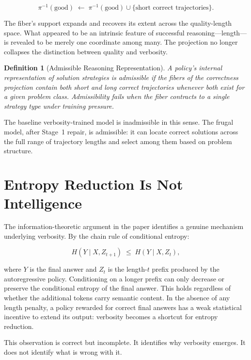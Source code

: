 \documentclass[11pt]{article}
\theoremstyle{rthm}
\theoremstyle{rdef}
\newtheorem{definition}[theorem]{Definition}
\theoremstyle{remark}
\begin{document}
\[
\pi^{-1}(\text{good}) \;\longleftarrow\; \pi^{-1}(\text{good})
\cup \{\text{short correct trajectories}\}.
\]

The fiber's support expands and recovers its extent across the
quality-length space. What appeared to be an
intrinsic feature of successful reasoning---length---is revealed to
be merely one coordinate among many. The projection no longer collapses
the distinction between quality and verbosity.

\begin{definition}[Admissible Reasoning Representation]
A policy's internal representation of solution strategies is
\emph{admissible} if the fibers of the correctness projection contain
both short and long correct trajectories whenever both exist for a
given problem class. Admissibility fails when the fiber contracts to
a single strategy type under training pressure.
\end{definition}

The baseline verbosity-trained model is inadmissible in this sense.
The frugal model, after Stage~1 repair, is admissible: it can locate
correct solutions across the full range of trajectory lengths and
select among them based on problem structure.

\section{Entropy Reduction Is Not Intelligence}
\label{sec:entropy}

The information-theoretic argument in the paper identifies a genuine
mechanism underlying verbosity. By the chain rule of conditional
entropy:

\[
H(Y \mid X, Z_{t+1}) \;\leq\; H(Y \mid X, Z_t),
\]

where $Y$ is the final answer and $Z_t$ is the length-$t$ prefix
produced by the autoregressive policy. Conditioning on a longer prefix
can only decrease or preserve the conditional entropy of the final
answer. This holds regardless of whether the additional tokens carry
semantic content. In the absence of any length penalty, a policy
rewarded for correct final answers has a weak statistical incentive to
extend its output: verbosity becomes a shortcut for entropy reduction.

This observation is correct but incomplete. It identifies why verbosity
emerges. It does not identify what is wrong with it.
\end{document}
